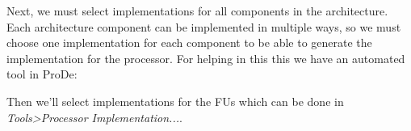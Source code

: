 \documentclass[a4paper,twoside]{tceusermanual}
\begin{document}
% 
% 
% 
% 
% 

Next, we must select implementations for all components in the architecture.
Each architecture component can be implemented in multiple ways, so we must
choose one implementation for each component to be able to generate the
implementation for the processor. For helping in this this we have an automated
tool in ProDe:




Then we'll select implementations for the FUs which can be done in
\textit{Tools>Processor Implementation...}. 
\end{document}
